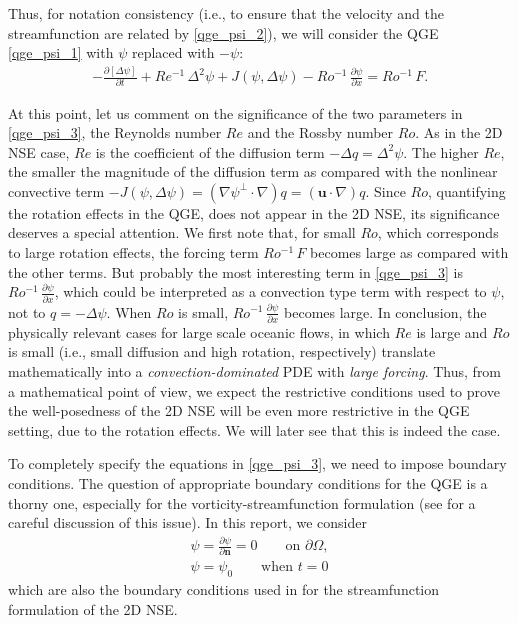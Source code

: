 Thus, for notation consistency (i.e., to ensure that the velocity and the
streamfunction are related by \eqref{qge_psi_2}), we will consider the QGE
\eqref{qge_psi_1} with $\psi$ replaced with $-\psi$:
\begin{align}
  -\frac{\partial \left[ \Delta \psi \right]}{\partial t} + Re^{-1} \, \Delta^2 \psi + J(\psi , \Delta \psi)
    - Ro^{-1} \, \frac{\partial \psi}{\partial x} = Ro^{-1} \, F .  \label{qge_psi_3}
\end{align}

At this point, let us comment on the significance of the two parameters in
\eqref{qge_psi_3}, the Reynolds number $Re$ and the Rossby number $Ro$.  As in
the 2D NSE case, $Re$ is the coefficient of the diffusion term $- \Delta q =
\Delta^2 \psi$.  The higher $Re$, the smaller the magnitude of the diffusion
term as compared with the nonlinear convective term $- J(\psi, \Delta \psi) = (
\nabla \psi^{\perp} \cdot \nabla ) q = (\mathbf{u} \cdot \nabla ) q$.  Since
$Ro$, quantifying the rotation effects in the QGE, does not appear in the 2D
NSE, its significance deserves a special attention.  We first note that, for
small $Ro$, which corresponds to large rotation effects, the forcing term
$Ro^{-1} \, F$ becomes large as compared with the other terms.  But probably the
most interesting term in \eqref{qge_psi_3} is $\displaystyle Ro^{-1} \,
\frac{\partial \psi}{\partial x}$, which could be interpreted as a convection
type term with respect to $\psi$, not to $q = -\Delta \psi$.  When $Ro$ is
small, $\displaystyle Ro^{-1} \, \frac{\partial \psi}{\partial x}$ becomes
large.  In conclusion, the physically relevant cases for large scale oceanic
flows, in which $Re$ is large and $Ro$ is small (i.e., small diffusion and high
rotation, respectively) translate mathematically into a
\emph{convection-dominated} PDE with \emph{large forcing}.  Thus, from a
mathematical point of view, we expect the restrictive conditions used to prove
the well-posedness of the 2D NSE \cite{Girault79,Girault86,Gunzburger89} will be
even more restrictive in the QGE setting, due to the rotation effects.  We will
later see that this is indeed the case.

To completely specify the equations in \eqref{qge_psi_3}, we need to impose
boundary conditions.  The question of appropriate boundary conditions for the
QGE is a thorny one, especially for the vorticity-streamfunction formulation
(see \cite{Vallis06,Cummins} for a careful discussion of this issue).  In this
report, we consider
\begin{equation}
  \begin{split}
    \psi = \frac{\partial \psi}{\partial \mathbf{n}} = 0 \qquad \text{on } \partial \Omega, \\
    \psi = \psi_0 \qquad \text{when } t = 0
  \end{split}
\label{qge_psi_4}
\end{equation}
which are also the boundary conditions used in \cite{Gunzburger89} for the
streamfunction formulation of the 2D NSE.

